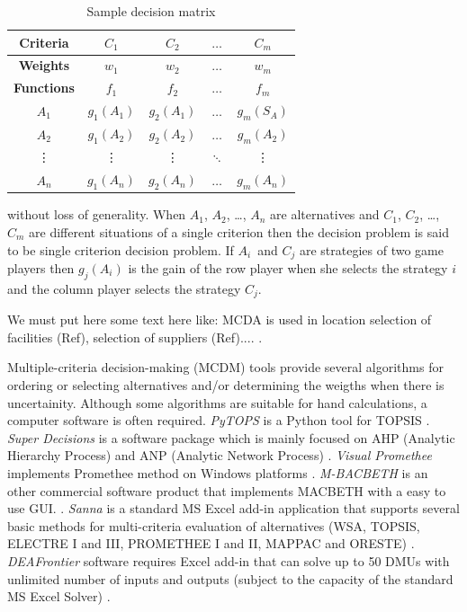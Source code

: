 \documentclass[authoryear,preprint,review,12pt]{elsarticle}
\begin{document}
\begin{table}[H]
	\centering
	\begin{tabular}{|c|c|c|c|c|}
		\hline
		\textbf{Criteria} & {$C_1$} & {$C_2$} & $\dots$ & {$C_m$} \\
		\hline
		\textbf{Weights} & {$w_1$} & {$w_2$} & $\dots$ & {$w_m$} \\
		\hline
		\textbf{Functions} & {$f_1$} & {$f_2$} & $\dots$ & {$f_m$} \\
		\hline
		\hline
		{$A_1$} & {$g_1(A_1)$} & {$g_2(A_1)$} & $\dots$ & {$g_m(S_A)$} \\
		\hline
		{$A_2$} & {$g_1(A_2)$} & {$g_2(A_2)$} & $\dots$ & {$g_m(A_2)$} \\
		\hline
		\vdots & \vdots & \vdots & $\ddots$ & \vdots  \\
		\hline		
		$A_n$ & $g_1(A_n) $ &  $g_2(A_n) $ & $\dots$ &  $g_m(A_n) $ \\
		\hline   
	\end{tabular}
	\caption{Sample decision matrix}
	\label{table:sample_decision_matrix} 
\end{table}

\noindent without loss of generality. When $A_1$, $A_2$, \dots, $A_n$ are alternatives and $C_1$, $C_2$, \dots, $C_m$ are different situations of a single criterion then the decision problem is said to be single criterion decision problem. If $A_i$ and $C_j$ are strategies of two game players then $g_j(A_i)$ is the gain of the row player when she selects the strategy $i$ and the column player selects the strategy $C_j$. 

{\color{red}We must put here some text here like:
MCDA is used in location selection of facilities (Ref), selection of suppliers (Ref)....
.}

Multiple-criteria decision-making (MCDM) tools provide several algorithms for ordering or  selecting alternatives and/or determining the weigths when there is uncertainity. Although some algorithms are suitable for hand calculations, a computer software is often required. \emph{PyTOPS} is a Python tool for TOPSIS \cite{PyTOPS}. \emph{Super Decisions} is a software package which is mainly focused on AHP (Analytic Hierarchy Process) and ANP (Analytic Network Process) \cite{superdecision}. \emph{Visual Promethee} implements Promethee method on Windows platforms \cite{visualpromethee}. \emph{M-BACBETH} is an other commercial software product that implements MACBETH with a easy to use GUI.  \cite{macbeth}. {\color{blue} \emph{Sanna} is a standard MS Excel add-in application that supports several basic methods for multi-criteria evaluation of alternatives (WSA, TOPSIS, ELECTRE I and III, PROMETHEE I and II, MAPPAC and ORESTE) \cite{sanna}. \emph{DEAFrontier} software requires Excel add-in that can solve up to 50 DMUs with unlimited number of inputs and outputs (subject to the capacity of the standard MS Excel Solver) \cite{deafrontier}. }
\end{document}
